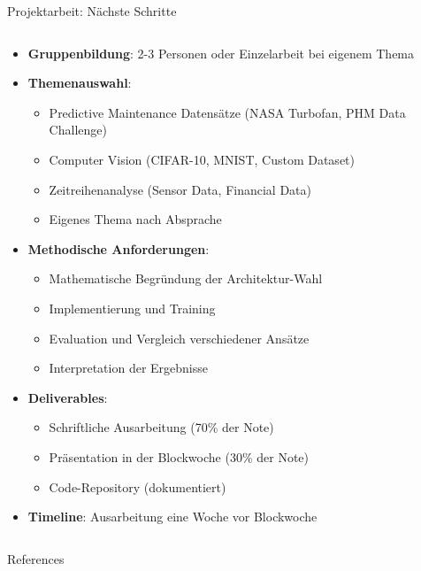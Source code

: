 \documentclass[aspectratio=1610, xcolor=dvipsnames, 9pt]{beamer}
\begin{document}
\begin{frame}{Projektarbeit: Nächste Schritte}
  \begin{columns}
    \begin{column}{1\textwidth}
      \begin{itemize}
        \item \textbf{Gruppenbildung}: 2-3 Personen oder Einzelarbeit bei eigenem Thema
        \item \textbf{Themenauswahl}: 
        \begin{itemize}
          \item Predictive Maintenance Datensätze (NASA Turbofan, PHM Data Challenge)
          \item Computer Vision (CIFAR-10, MNIST, Custom Dataset)
          \item Zeitreihenanalyse (Sensor Data, Financial Data)
          \item Eigenes Thema nach Absprache
        \end{itemize}
        \item \textbf{Methodische Anforderungen}:
        \begin{itemize}
          \item Mathematische Begründung der Architektur-Wahl
          \item Implementierung und Training
          \item Evaluation und Vergleich verschiedener Ansätze
          \item Interpretation der Ergebnisse
        \end{itemize}
        \item \textbf{Deliverables}:
        \begin{itemize}
          \item Schriftliche Ausarbeitung (70\% der Note)
          \item Präsentation in der Blockwoche (30\% der Note)
          \item Code-Repository (dokumentiert)
        \end{itemize}
        \item \textbf{Timeline}: Ausarbeitung eine Woche vor Blockwoche
      \end{itemize}
    \end{column}
  \end{columns}
\end{frame}

      



\begin{frame}[allowframebreaks]{References}
 
 
\end{frame}
\end{document}
